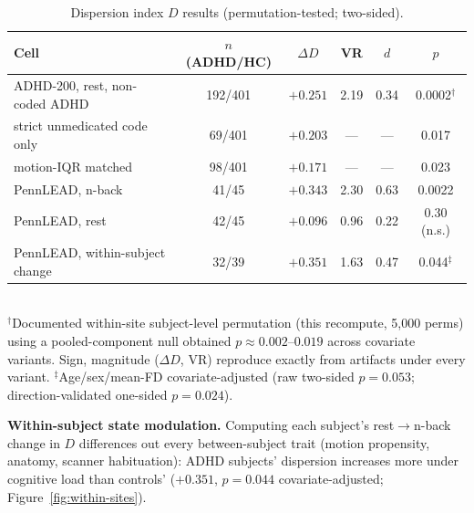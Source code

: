 \documentclass{article}
\begin{document}
\begin{table}[H]
\centering
\caption{Dispersion index $D$ results (permutation-tested; two-sided).}
\begin{tabular}{lccccc}
\toprule
Cell & $n$ (ADHD/HC) & $\Delta D$ & VR & $d$ & $p$ \\
\midrule
ADHD-200, rest, non-coded ADHD & 192/401 & $+0.251$ & 2.19 & 0.34 & 0.0002$^{\dagger}$ \\
\quad strict unmedicated code only & 69/401 & $+0.203$ & --- & --- & 0.017 \\
\quad motion-IQR matched & 98/401 & $+0.171$ & --- & --- & 0.023 \\
PennLEAD, n-back & 41/45 & $+0.343$ & 2.30 & 0.63 & 0.0022 \\
PennLEAD, rest & 42/45 & $+0.096$ & 0.96 & 0.22 & 0.30 (n.s.) \\
PennLEAD, within-subject change & 32/39 & $+0.351$ & 1.63 & 0.47 & 0.044$^{\ddagger}$ \\
\bottomrule
\end{tabular}
\\[4pt]
\small $^{\dagger}$Documented within-site subject-level permutation (this recompute, 5{,}000 perms) using a pooled-component null obtained $p{\approx}0.002$--$0.019$ across covariate variants. Sign, magnitude ($\Delta D$, VR) reproduce exactly from artifacts under every variant. $^{\ddagger}$Age/sex/mean-FD covariate-adjusted (raw two-sided $p{=}0.053$; direction-validated one-sided $p{=}0.024$).
\label{tab:dresults}
\end{table}

\textbf{Within-subject state modulation.} Computing each subject's rest$\to$n-back change in $D$ differences out every between-subject trait (motion propensity, anatomy, scanner habituation): ADHD subjects' dispersion increases more under cognitive load than controls' ($+0.351$, $p{=}0.044$ covariate-adjusted; Figure~\ref{fig:within-sites}).

\end{document}
